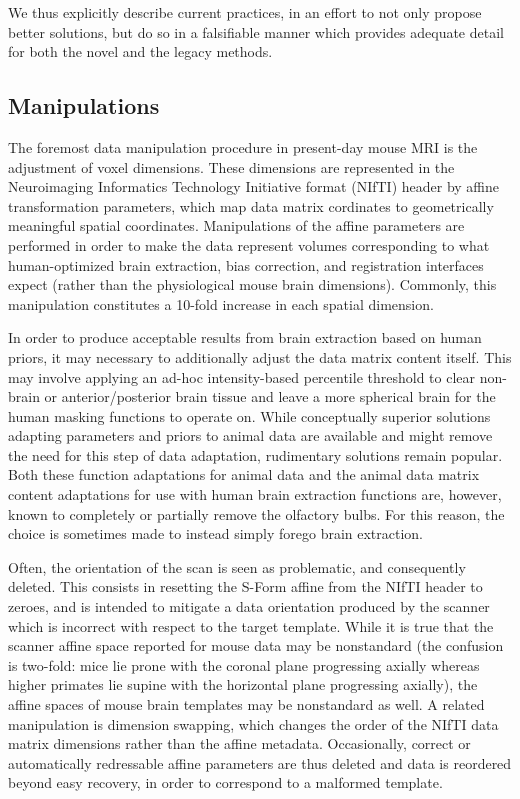 We thus explicitly describe current practices, in an effort to not only propose better solutions, but do so in a falsifiable manner which provides adequate detail for both the novel and the legacy methods.

\subsection{Manipulations}
The foremost data manipulation procedure in present-day mouse MRI is the adjustment of voxel dimensions.
These dimensions are represented in the Neuroimaging Informatics Technology Initiative format (NIfTI) header \cite{nifti} by affine transformation parameters, which map data matrix cordinates to geometrically meaningful spatial coordinates.
Manipulations of the affine parameters are performed in order to make the data represent volumes corresponding to what human-optimized brain extraction, bias correction, and registration interfaces expect (rather than the physiological mouse brain dimensions).
Commonly, this manipulation constitutes a 10-fold increase in each spatial dimension.

In order to produce acceptable results from brain extraction based on human priors, it may necessary to additionally adjust the data matrix content itself.
This may involve applying an ad-hoc intensity-based percentile threshold to clear non-brain or anterior/posterior brain tissue and leave a more spherical brain for the human masking functions to operate on.
While conceptually superior solutions adapting parameters and priors to animal data are available \cite{rbet,Oguz2014} and might remove the need for this step of data adaptation, rudimentary solutions remain popular.
Both these function adaptations for animal data and the animal data matrix content adaptations for use with human brain extraction functions are, however, known to completely or partially remove the olfactory bulbs.
For this reason, the choice is sometimes made to instead simply forego brain extraction.

Often, the orientation of the scan is seen as problematic, and consequently deleted.
This consists in resetting the S-Form affine from the NIfTI header to zeroes, and is intended to mitigate a data orientation produced by the scanner which is incorrect with respect to the target template.
While it is true that the scanner affine space reported for mouse data may be nonstandard (the confusion is two-fold: mice lie prone with the coronal plane progressing axially whereas higher primates lie supine with the horizontal plane progressing axially), the affine spaces of mouse brain templates may be nonstandard as well.
A related manipulation is dimension swapping, which changes the order of the NIfTI data matrix dimensions rather than the affine metadata.
Occasionally, correct or automatically redressable affine parameters are thus deleted and data is reordered beyond easy recovery, in order to correspond to a malformed template.

